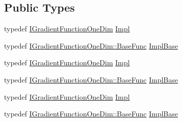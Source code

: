 \subsection*{Public Types}
\begin{DoxyCompactItemize}
\item 
typedef \mbox{\hyperlink{classROOT_1_1Math_1_1IGradientFunctionOneDim}{I\+Gradient\+Function\+One\+Dim}} \mbox{\hyperlink{classROOT_1_1Math_1_1GradFunctor1D_a76566ff5310b5900b8df38e0884b3210}{Impl}}
\item 
typedef \mbox{\hyperlink{classROOT_1_1Math_1_1IGradientFunctionOneDim_a9eae6bcbeb2d0396937710bd70bd29d0}{I\+Gradient\+Function\+One\+Dim\+::\+Base\+Func}} \mbox{\hyperlink{classROOT_1_1Math_1_1GradFunctor1D_a16b436a0d100aa6c16ee66961c4f5b97}{Impl\+Base}}
\item 
typedef \mbox{\hyperlink{classROOT_1_1Math_1_1IGradientFunctionOneDim}{I\+Gradient\+Function\+One\+Dim}} \mbox{\hyperlink{classROOT_1_1Math_1_1GradFunctor1D_a76566ff5310b5900b8df38e0884b3210}{Impl}}
\item 
typedef \mbox{\hyperlink{classROOT_1_1Math_1_1IGradientFunctionOneDim_a9eae6bcbeb2d0396937710bd70bd29d0}{I\+Gradient\+Function\+One\+Dim\+::\+Base\+Func}} \mbox{\hyperlink{classROOT_1_1Math_1_1GradFunctor1D_a16b436a0d100aa6c16ee66961c4f5b97}{Impl\+Base}}
\item 
typedef \mbox{\hyperlink{classROOT_1_1Math_1_1IGradientFunctionOneDim}{I\+Gradient\+Function\+One\+Dim}} \mbox{\hyperlink{classROOT_1_1Math_1_1GradFunctor1D_a76566ff5310b5900b8df38e0884b3210}{Impl}}
\item 
typedef \mbox{\hyperlink{classROOT_1_1Math_1_1IGradientFunctionOneDim_a9eae6bcbeb2d0396937710bd70bd29d0}{I\+Gradient\+Function\+One\+Dim\+::\+Base\+Func}} \mbox{\hyperlink{classROOT_1_1Math_1_1GradFunctor1D_a16b436a0d100aa6c16ee66961c4f5b97}{Impl\+Base}}
\end{DoxyCompactItemize}
